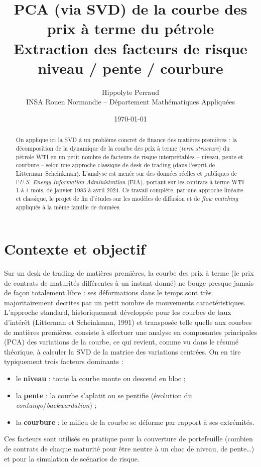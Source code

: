 \documentclass[11pt,a4paper]{article}
\title{\vspace{-1.5cm}\textbf{PCA (via SVD) de la courbe des prix à terme du pétrole\\
\large Extraction des facteurs de risque niveau / pente / courbure}}
\author{Hippolyte Perraud \\ \small INSA Rouen Normandie -- Département Mathématiques Appliquées}
\date{\today}
\begin{document}
\maketitle
\thispagestyle{fancy}

\begin{abstract}
\noindent On applique ici la SVD à un problème concret de finance des matières premières : la décomposition de la dynamique de la courbe des prix à terme (\emph{term structure}) du pétrole WTI en un petit nombre de facteurs de risque interprétables -- niveau, pente et courbure -- selon une approche classique de desk de trading (dans l'esprit de Litterman--Scheinkman). L'analyse est menée sur des données réelles et publiques de l'\emph{U.S. Energy Information Administration} (EIA), portant sur les contrats à terme WTI 1 à 4 mois, de janvier 1985 à avril 2024. Ce travail complète, par une approche linéaire et classique, le projet de fin d'études sur les modèles de diffusion et de \emph{flow matching} appliqués à la même famille de données.
\end{abstract}

\section{Contexte et objectif}

Sur un desk de trading de matières premières, la courbe des prix à terme (le prix de contrats de maturités différentes à un instant donné) ne bouge presque jamais de façon totalement libre : ses déformations dans le temps sont très majoritairement decrites par un petit nombre de mouvements caractéristiques. L'approche standard, historiquement développée pour les courbes de taux d'intérêt (Litterman et Scheinkman, 1991) et transposée telle quelle aux courbes de matières premières, consiste à effectuer une analyse en composantes principales (PCA) des variations de la courbe, ce qui revient, comme vu dans le résumé théorique, à calculer la SVD de la matrice des variations centrées. On en tire typiquement trois facteurs dominants :
\begin{itemize}[nosep]
    \item le \textbf{niveau} : toute la courbe monte ou descend en bloc ;
    \item la \textbf{pente} : la courbe s'aplatit ou se pentifie (évolution du \emph{contango}/\emph{backwardation}) ;
    \item la \textbf{courbure} : le milieu de la courbe se déforme par rapport à ses extrémités.
\end{itemize}
Ces facteurs sont utilisés en pratique pour la couverture de portefeuille (combien de contrats de chaque maturité pour être neutre à un choc de niveau, de pente\ldots) et pour la simulation de scénarios de risque.
\end{document}
